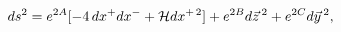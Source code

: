 \begin{equation}
ds^2=e^{2A}[-4\,dx^+dx^-+{\cal H}dx^{+\,2}]
+e^{2B}d\vec z\,^2 +e^{2C}d\vec y\,^2,
\label{eq:44met}
\end{equation}

